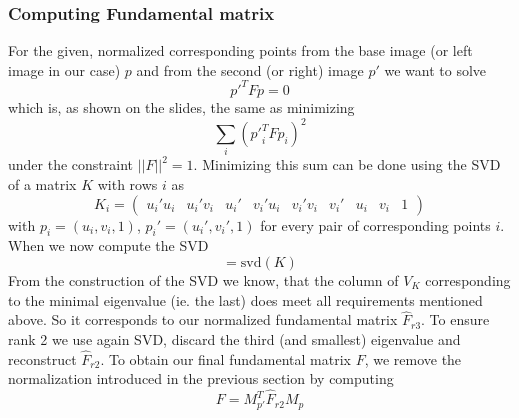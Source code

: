 \documentclass{paper}
\begin{document}
\subsubsection{Computing Fundamental matrix}
For the given, normalized corresponding points from the base image (or left image in our case) $p$ and from the second (or right) image $p'$ 
we want to solve 
\begin{equation}
	p'^T F p = 0
\end{equation}
which is, as shown on the slides, the same as minimizing
\begin{equation}
	\sum_i ({p'}_i^T F p_i)^2
\end{equation}
under the constraint $||F||^2 = 1$. Minimizing this sum can be done using the SVD of a matrix $K$ with rows $i$ as
\begin{equation}
K_i = 
\begin{pmatrix}
 u_i'u_i & u_i'v_i & u_i' & v_i'u_i & v_i'v_i & v_i' & u_i & v_i & 1 
\end{pmatrix}
\end{equation}
with $p_i = (u_i,v_i,1)$, $p_i' = (u_i',v_i',1)$ for every pair of corresponding points $i$. When we now compute the SVD
\begin{equation}
	[U_K, D_K, V_K] = \text{svd}(K)
\end{equation}
From the construction of the SVD we know, that the column of $V_K$ corresponding to the minimal eigenvalue (ie. the last) does meet all
requirements mentioned above. So it corresponds to our normalized
fundamental matrix $\hat{F}_{r3}$. To ensure rank 2 we use again SVD, 
discard the third (and smallest) eigenvalue and reconstruct $\hat{F}_{r2}$. 
To obtain our final fundamental matrix $F$, we remove the normalization introduced in the previous section by computing 
   \begin{equation}
   F = M_{p'}^ T \hat{F}_{r2} M_p
   \end{equation}
   
\end{document}
